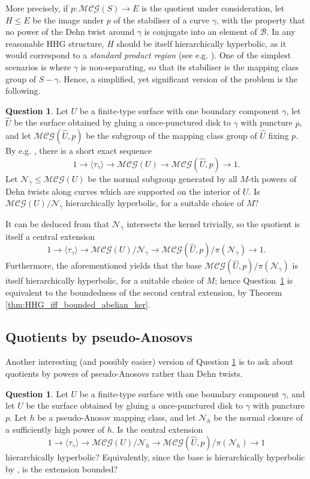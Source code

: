 \documentclass[svgnames]{amsart}
\theoremstyle{plain}
\theoremstyle{definition}
\newtheorem{question}[thm]{Question}
\newcommand{\cal}[1]{\mathcal{#1}}
\newcommand{\calG}{\cal{MCG}}
\newcommand{\N}{\cal{N}}
\newcommand{\h}[1]{\widehat{#1}}
\begin{document}
More precisely, if $p\colon \calG(S)\to E$ is the quotient under consideration, let $H\le E$ be the image under $p$ of the stabiliser of a curve $\gamma$, with the property that no power of the Dehn twist around $\gamma$ is conjugate into an element of $\cal B$. In any reasonable HHG structure, $H$ should be itself hierarchically hyperbolic, as it would correspond to a \emph{standard product region} (see e.g. \cite[Definition 5.15]{HHS_II}). One of the simplest scenarios is where $\gamma$ is non-separating, so that its stabiliser is the mapping class group of $S-\gamma$. Hence, a simplified, yet significant version of the problem is the following. 

\begin{question}\label{quest:mcg/dt_interior}
Let $U$ be a finite-type surface with one boundary component $\gamma$, let $\h U$ be the surface obtained by gluing a once-punctured disk to $\gamma$ with puncture $p$, and let $\calG(\h U,p)$ be the subgroup of the mapping class group of $\h U$ fixing $p$. By e.g. \cite[Proposition 3.19]{FarbMargalit}, there is a short exact sequence
   \[
       1\to \langle \tau_\gamma\rangle \to\calG(U)\to\calG(\h U,p)\to1.
    \]
   Let $\N_\gamma\le \calG(U)$ be the normal subgroup generated by all $M$-th powers of Dehn twists along curves which are supported on the interior of $U$.  
Is $\calG(U)/\N_\gamma$ hierarchically hyperbolic, for a suitable choice of $M$?
\end{question} 

It can be deduced from \cite{dahmani:rotating} that $\N_\gamma$ intersects the kernel trivially, so the quotient is itself a central extension 
\[
    1\to \langle \tau_\gamma\rangle \to\calG(U)/\N_\gamma\to\calG(\h U, p)/\pi(\N_\gamma)\to1.
\]
Furthermore, the aforementioned \cite[Theorem 7.1]{BHMS} yields that the base $\calG(\h U, p)/\pi(\N_\gamma)$ is itself hierarchically hyperbolic, for a suitable choice of $M$; hence Question~\ref{quest:mcg/dt_interior} is equivalent to the boundedness of the second central extension, by Theorem \ref{thm:HHG_iff_bounded_abelian_ker}.

\subsection{Quotients by pseudo-Anosovs}
Another interesting (and possibly easier) version of Question \ref{quest:mcg/dt_interior} is to ask about quotients by powers of pseudo-Anosovs rather than Dehn twists.

\begin{question}
\label{quest:quot_by_pA}
Let $U$ be a finite-type surface with one boundary component $\gamma$, and let $\h U$ be the surface obtained by gluing a once-punctured disk to $\gamma$ with puncture $p$.  Let $h$ be a pseudo-Anosov mapping class, and let $\N_h$ be the normal closure of a sufficiently high power of $h$. Is the central extension
\[
    1\to \langle \tau_\gamma\rangle \to\calG(U)/\N_h\to\calG(\h U,p)/\pi(\N_h)\to1
\]
    hierarchically hyperbolic? Equivalently, since the base is hierarchically hyperbolic by \cite[Theorem 6.2]{hhs_asdim}, is the extension bounded?
\end{question}
\end{document}
